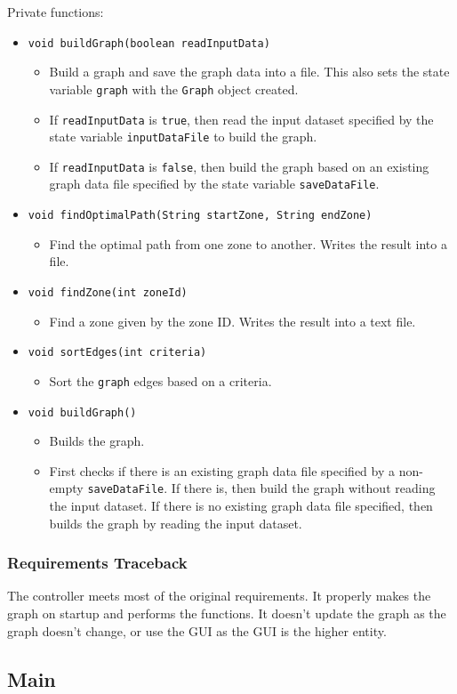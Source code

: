 \documentclass[12pt]{article}
\newcommand{\bi}{\begin{itemize}}
\newcommand{\ei}{\end{itemize}}
\newcommand{\code}[1]{\texttt{#1}}
\begin{document}
\noindent Private functions:
\bi
   	\item \code{void buildGraph(boolean readInputData)}
	\bi
		\item Build a graph and save the graph data into a file. This also sets the state variable \code{graph} with the \code{Graph} object created. 
		\item If \code{readInputData} is \code{true}, then read the input dataset specified by the state variable \code{inputDataFile} to build the graph.
		\item If \code{readInputData} is \code{false}, then build the graph based on an existing graph data file specified by the state variable \code{saveDataFile}. 
	\ei
   	\item \code{void findOptimalPath(String startZone, String endZone)}
	\bi
		\item Find the optimal path from one zone to another. Writes the result into a file.
	\ei
   	\item \code{void findZone(int zoneId)}
	\bi
		\item Find a zone given by the zone ID. Writes the result into a text file. 
	\ei
   	\item \code{void sortEdges(int criteria)}
	\bi
		\item Sort the \code{graph} edges based on a criteria.
	\ei
   	\item \code{void buildGraph()}
	\bi
		\item Builds the graph. 
		\item First checks if there is an existing graph data file specified by a non-empty \code{saveDataFile}. If there is, then build the graph without reading the input dataset. If there is no existing graph data file specified, then builds the graph by reading the input dataset. 
	\ei
\ei
\subsubsection{Requirements Traceback}

The controller meets most of the original requirements. It properly makes the graph on startup and performs the functions. It doesn't update the graph as the graph doesn't change, or use the GUI as the GUI is the higher entity.

\newpage

\subsection{Main}
\end{document}
